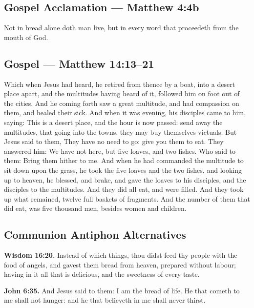 \subsection*{Gospel Acclamation --- Matthew 4:4b}
Not in bread alone doth man live, but in every word that proceedeth from the
mouth of God.

\subsection*{Gospel --- Matthew 14:13--21}
Which when Jesus had heard, he retired from thence by a boat, into a desert
place apart, and the multitudes having heard of it, followed him on foot out
of the cities. And he coming forth saw a great multitude, and had compassion
on them, and healed their sick. And when it was evening, his disciples came
to him, saying: This is a desert place, and the hour is now passed: send away
the multitudes, that going into the towns, they may buy themselves victuals.
But Jesus said to them, They have no need to go: give you them to eat. They
answered him: We have not here, but five loaves, and two fishes. Who said to
them: Bring them hither to me. And when he had commanded the multitude to sit
down upon the grass, he took the five loaves and the two fishes, and looking
up to heaven, he blessed, and brake, and gave the loaves to his disciples,
and the disciples to the multitudes. And they did all eat, and were filled.
And they took up what remained, twelve full baskets of fragments. And the
number of them that did eat, was five thousand men, besides women and
children.

\subsection*{Communion Antiphon Alternatives}
\textbf{Wisdom 16:20.} Instead of which things, thou didst feed thy people
with the food of angels, and gavest them bread from heaven, prepared without
labour; having in it all that is delicious, and the sweetness of every taste.

\textbf{John 6:35.} And Jesus said to them: I am the bread of life. He that
cometh to me shall not hunger: and he that believeth in me shall never thirst.
